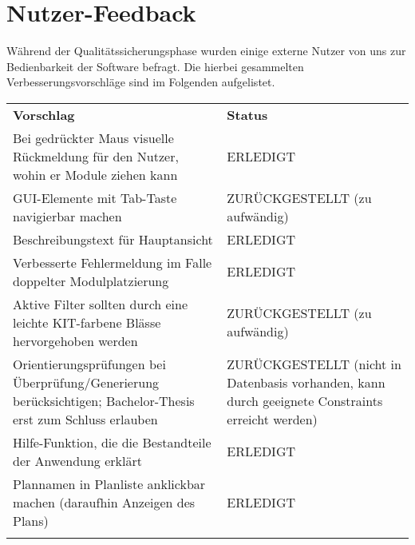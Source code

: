 \FloatBarrier
\section{Nutzer-Feedback}

Während der Qualitätssicherungsphase wurden einige externe Nutzer von uns zur Bedienbarkeit der Software befragt. Die hierbei gesammelten Verbesserungsvorschläge sind im Folgenden aufgelistet.

\begin{longtable}{| >{\hspace{0pt}} p{} | >{\hspace{0pt}} p{} | }
	\hline
	\textbf{Vorschlag} & \textbf{Status} \\ 
	\hhline{|=|=|}
	\endfirsthead
	\endhead
	Bei gedrückter Maus visuelle Rückmeldung für den Nutzer, wohin er Module ziehen kann 
	& ERLEDIGT \\
	\hline
	GUI-Elemente mit Tab-Taste navigierbar machen 
	& ZURÜCKGESTELLT (zu aufwändig) \\
	\hline 
	Beschreibungstext für Hauptansicht 
	& ERLEDIGT \\
	\hline
	Verbesserte Fehlermeldung im Falle doppelter Modulplatzierung
	& ERLEDIGT \\
	\hline
	Aktive Filter sollten durch eine leichte KIT-farbene Blässe hervorgehoben werden
	& ZURÜCKGESTELLT (zu aufwändig) \\
	\hline
	Orientierungsprüfungen bei Überprüfung/Generierung berücksichtigen; Bachelor-Thesis erst zum Schluss erlauben
	& ZURÜCKGESTELLT (nicht in Datenbasis vorhanden, kann durch geeignete Constraints erreicht werden) \\
	\hline
	Hilfe-Funktion, die die Bestandteile der Anwendung erklärt
	& ERLEDIGT \\
	\hline
	Plannamen in Planliste anklickbar machen (daraufhin Anzeigen des Plans)
	& ERLEDIGT \\
	\hhline{|=|=|}
\end{longtable}